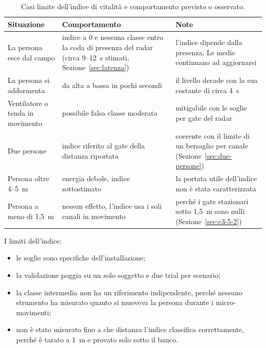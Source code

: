 \begin{table}[htbp]
\centering
\caption{Casi limite dell'indice di vitalità e comportamento previsto o osservato.}
\label{tab:vitalita-casilimite}
\small
\begin{tabularx}{\linewidth}{@{}XXX@{}}
\toprule
\textbf{Situazione} & \textbf{Comportamento} & \textbf{Note} \\
\midrule
La persona esce dal campo & indice a 0 e nessuna classe entro la coda di presenza
  del radar (circa 9--12~s stimati, Sezione~\ref{sec:latenza}) & l'indice dipende dalla presenza. Le medie continuano ad aggiornarsi \\
La persona si addormenta & da alta a bassa in pochi secondi & il livello decade con la sua costante di circa 4~s \\
Ventilatore o tenda in movimento & possibile falsa classe moderata & mitigabile con le soglie per gate del radar \\
Due persone & indice riferito al gate della distanza riportata & coerente con il
  limite di un bersaglio per canale (Sezione~\ref{sec:due-persone}) \\
Persona oltre 4--5~m & energia debole, indice sottostimato & la portata utile
  dell'indice non è stata caratterizzata \\
Persona a meno di 1,5~m & nessun effetto, l'indice usa i soli canali in movimento &
  perché i gate stazionari sotto 1,5~m sono nulli (Sezione~\ref{sec:c3-5-2}) \\
\bottomrule
\end{tabularx}
\end{table}

I limiti dell'indice:

\begin{itemize}
    \item le soglie sono specifiche dell'installazione;

    \item la validazione poggia su un solo soggetto e due trial per scenario;

    \item la classe intermedia non ha un riferimento indipendente, perché nessuno strumento ha misurato quanto si muoveva la persona durante i micro-movimenti;

    \item non è stato misurato fino a che distanza l'indice classifica correttamente, perché è tarato a 1~m e provato solo sotto il banco.
\end{itemize}

